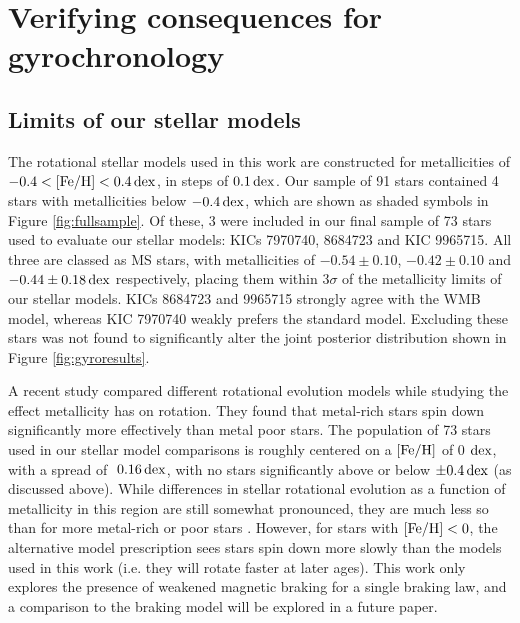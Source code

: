 \section{Verifying consequences for gyrochronology}
\subsection{Limits of our stellar models}\label{ssec:limits}
The rotational stellar models used in this work \cite{vansaders+2019} are constructed for metallicities of $-0.4 < \rm{[Fe/H]} < 0.4\, \rm{dex}$, in steps of $0.1\, \rm {dex}$. Our sample of 91 stars contained 4 stars with metallicities below $-0.4\, \rm{dex}$, which are shown as shaded symbols in Figure \ref{fig:fullsample}. Of these, 3 were included in our final sample of 73 stars used to evaluate our stellar models: KICs 7970740, 8684723 and KIC 9965715. All three are classed as MS stars, with metallicities of $-0.54 \pm 0.10$, $-0.42 \pm 0.10$ and $-0.44 \pm 0.18\, \rm {dex}$ respectively, placing them within $3\sigma$ of the metallicity limits of our stellar models. KICs 8684723 and 9965715 strongly agree with the WMB model, whereas KIC 7970740 weakly prefers the standard model. Excluding these stars was not found to significantly alter the joint posterior distribution shown in Figure \ref{fig:gyroresults}.

A recent study \cite{amard+matt2020} compared different rotational evolution models \cite[of which we use the former in this work]{vansaders+pinsonneault2013,matt+2015} while studying the effect metallicity has on rotation. They found that metal-rich stars spin down significantly more effectively than metal poor stars. The population of 73 stars used in our stellar model comparisons is roughly centered on a $\rm{[Fe/H]}$ of 0 $\rm dex$, with a spread of $~0.16\, \rm dex$, with no stars significantly above or below $\pm 0.4\, \rm dex$ (as discussed above). While differences in stellar rotational evolution as a function of metallicity in this region are still somewhat pronounced, they are much less so than for more metal-rich or poor stars \cite[see Figure 2]{amard+matt2020}. However, for stars with $\mbox{$\rm{[Fe/H]}$} < 0$, the alternative model prescription \cite{matt+2015} sees stars spin down more slowly than the models used in this work (i.e. they will rotate faster at later ages). This work only explores the presence of weakened magnetic braking for a single braking law, and a comparison to the \cite{matt+2015} braking model will be explored in a future paper.

